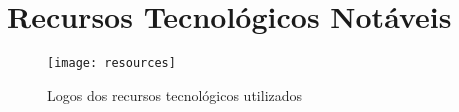 \AddToShipoutPicture{\BackgroundPic}

\section*{Recursos Tecnológicos Notáveis}
	\begin{figure}[htb]
		\centering
		\texttt{[image: resources]}
		\caption{Logos dos recursos tecnológicos utilizados}
	\end{figure}

